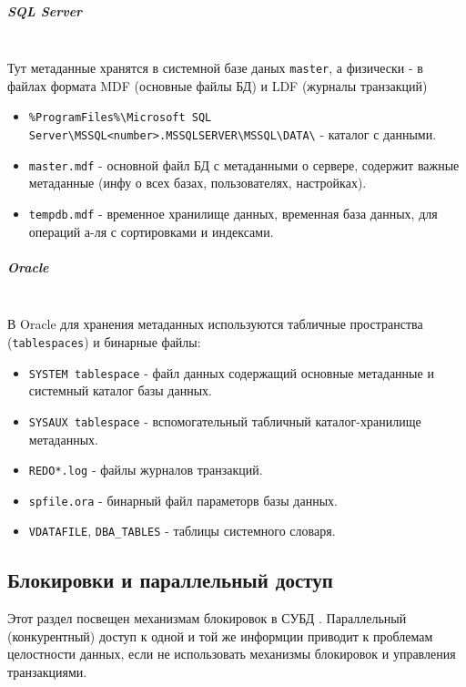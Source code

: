 \subparagraph{SQL Server} \autocite{MicrosoftLearnSQLserverMasterdb,MicrosoftLearnSQLserverTempdb,MicrosoftLearnSQLserverDBfiles,MicrosoftLearnSQLserverFileLoc} ~\\

Тут метаданные хранятся в системной базе даных \texttt{master}, а физически - в файлах формата MDF (основные файлы БД) и LDF (журналы транзакций)

\begin{itemize}
    \item \texttt{\%ProgramFiles\%\textbackslash{}Microsoft SQL Server\textbackslash{}MSSQL<number>.MSSQLSERVER\textbackslash{}MSSQL\textbackslash{}DATA\textbackslash{}} - каталог с данными.
    \item \texttt{master.mdf} - основной файл БД с метаданными о сервере, содержит важные метаданные (инфу о всех базах, пользователях, настройках).
    \item \texttt{tempdb.mdf} - временное хранилище данных, временная база данных, для операций а-ля с сортировками и индексами.
\end{itemize}


\subparagraph{Oracle} \autocites[§1.338]{oracledbdoc0}{oracledbdoc4}{OracleRedoLog} ~\\

В Oracle для хранения метаданных используются табличные пространства (\texttt{tablespaces}) и бинарные файлы:

\begin{itemize}
    \item \texttt{SYSTEM tablespace} - файл данных содержащий основные метаданные и системный каталог базы данных.
    \item \texttt{SYSAUX tablespace} - вспомогательный табличный каталог-хранилище метаданных.
    \item \texttt{REDO*.log} - файлы журналов транзакций.
    \item \texttt{spfile.ora} - бинарный файл параметорв базы данных.
    \item \texttt{V\textdollar DATAFILE}, \texttt{DBA\_TABLES} - таблицы системного словаря.
\end{itemize}

\subsection{Блокировки и параллельный доступ}

Этот раздел посвещен механизмам блокировок в СУБД \autocites[c.22]{ElmasriNavathe}[c. 18]{Silberschatz}. Параллельный (конкурентный) доступ к одной и той же информции приводит к проблемам целостности данных, если не использовать механизмы блокировок и управления транзакциями.

